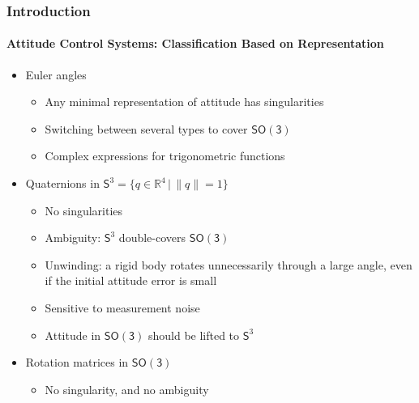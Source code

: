 \documentclass[11pt,professionalfonts,hyperref={pdftex,pdfpagemode=none,pdfstartview=FitH}]{beamer}
\newcommand{\SO}{\ensuremath{\mathsf{SO(3)}}}
\renewcommand{\Re}{\ensuremath{\mathbb{R}}}
\newcommand{\Sph}{\ensuremath{\mathsf{S}}}
\renewcommand{\emph}[1]{\textit{\textbf{\color{blue}{#1}}}}
\begin{document}
\begin{frame}
\frametitle{Introduction}
\framesubtitle{Attitude Control Systems: Classification Based on Representation}

\begin{itemize}
	\item Euler angles
	\begin{itemize}
	\item Any minimal representation of attitude has singularities
	\item Switching between several types to cover $\SO$
	\item Complex expressions for trigonometric functions
	\end{itemize}
\vspace*{0.3cm}\pause
	\item Quaternions in $\Sph^3=\{q\in\Re^4\,|\, \|q\|=1\}$
	\begin{itemize}
	\item No singularities
	\item Ambiguity: $\Sph^3$ double-covers $\SO$
	\pause
	\item Unwinding: a rigid body rotates unnecessarily through a large angle, even if the initial attitude error is small %
	\item Sensitive to measurement noise %
	\pause
	\item Attitude in $\SO$ should be \emph{carefully} lifted to $\Sph^3$
	\end{itemize}
\vspace*{0.3cm}\pause
	\item Rotation matrices in $\SO$	
	\begin{itemize}
	\item No singularity, and no ambiguity
	\end{itemize}
\end{itemize}

\end{frame}
\end{document}
